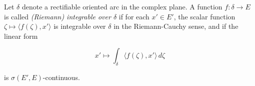 Let $\delta$ denote a rectifiable oriented arc in the complex plane. A function $f: \delta \rightarrow E$ is called \emph{(Riemann) integrable over $\delta$} if for each $x' \in E'$, the scalar function $\zeta \mapsto \langle f(\zeta), x' \rangle$ is integrable over $\delta$ in the Riemann-Cauchy sense, and if the linear form

$$x' \mapsto \int_{\delta} \langle f(\zeta), x' \rangle \, d\zeta$$

is $\sigma(E', E)$-continuous.

